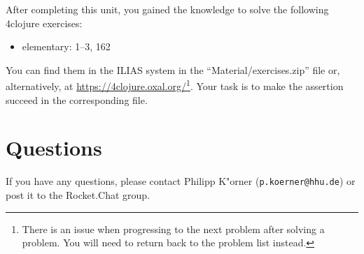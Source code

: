\documentclass[11pt,a4paper]{article}
\begin{document}
    \begin{exercise}
        After completing this unit, you gained the knowledge to solve the following 4clojure exercises:

        \begin{itemize}
            \item elementary: 1--3, 162
        \end{itemize}

        \noindent You can find them in the ILIAS system in the ``Material/exercises.zip'' file or, alternatively,
        at \url{https://4clojure.oxal.org/}\footnote{There is an issue when progressing to the next problem after solving a problem. You will need to return back to the problem list instead.}.
        Your task is to make the assertion succeed in the corresponding file.
    \end{exercise}
	
	
    \enlargethispage{2\baselineskip}
	\section*{Questions}
	If you have any questions, please contact Philipp K"orner (\texttt{p.koerner@hhu.de}) or post it to the Rocket.Chat group.
\end{document}
